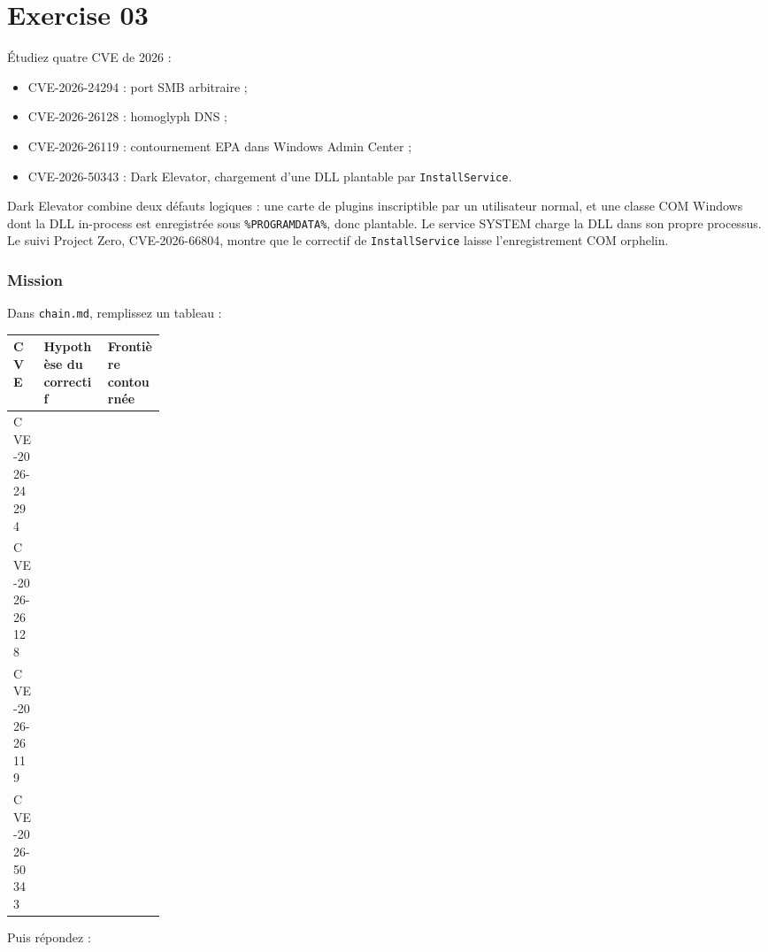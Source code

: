 \documentclass{training}
\begin{document}
\chapter{Exercise 03}
\makeheaderfiles

Étudiez quatre CVE de 2026 :

\begin{itemize}
  \item CVE-2026-24294 : port SMB arbitraire ;
  \item CVE-2026-26128 : homoglyph DNS ;
  \item CVE-2026-26119 : contournement EPA dans Windows Admin Center ;
  \item CVE-2026-50343 : Dark Elevator, chargement d'une DLL plantable
        par \texttt{InstallService}.
\end{itemize}

Dark Elevator combine deux défauts logiques : une carte de plugins
inscriptible par un utilisateur normal, et une classe COM Windows dont la
DLL in-process est enregistrée sous \texttt{\%PROGRAMDATA\%}, donc
plantable. Le service SYSTEM charge la DLL dans son propre processus. Le
suivi Project Zero, CVE-2026-66804, montre que le correctif de
\texttt{InstallService} laisse l'enregistrement COM orphelin.

\subsection*{Mission}

Dans \texttt{chain.md}, remplissez un tableau :

\begin{center}
\begin{tabularx}{\linewidth}{|p{0.2\linewidth}|X|X|}
\hline
\textbf{CVE} & \textbf{Hypothèse du correctif} & \textbf{Frontière contournée} \\ \hline
CVE-2026-24294 & & \\ \hline
CVE-2026-26128 & & \\ \hline
CVE-2026-26119 & & \\ \hline
CVE-2026-50343 & & \\ \hline
\end{tabularx}
\end{center}

Puis répondez :
\end{document}
